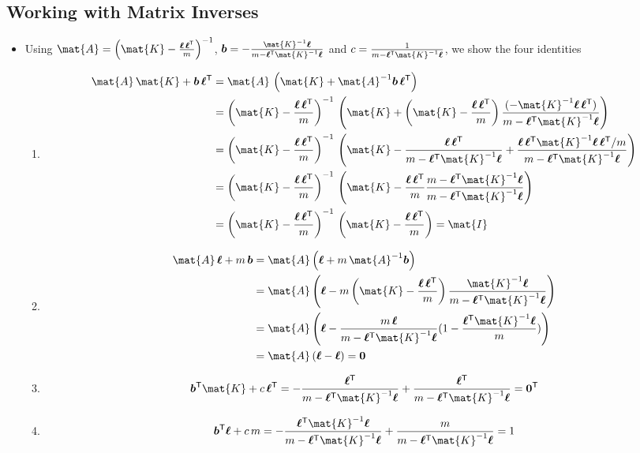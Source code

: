 \documentclass[11pt]{article}
\newcommand{\tr}{\textsf{T}}
\newcommand{\vl}{\bm{\ell}}
\newcommand{\vb}{\bm{b}}
\begin{document}
\subsection{Working with Matrix Inverses}
\label{sec:org75c8006}
\begin{itemize}
\item Using \(\mat{A} = 
         \left(\mat{K}-\frac{\vl\,\vl^\tr}{m}\right)^{-1}\),
\(\vb=-\frac{\mat{K}^{-1} \vl}{m-\vl^\tr \mat{K}^{-1}\vl}\)
and \(c=\frac{1}{m-\vl^\tr \mat{K}^{-1}\vl}\), we show the four identities
\begin{enumerate}
\item \begin{align*}
\mat{A}\,\mat{K} + \vb\,\vl^\tr
&= \mat{A}\,\left(\mat{K} + \mat{A}^{-1} \vb\,\vl^\tr\right) \\
&=\left(\mat{K}-\frac{\vl\,\vl^\tr}{m}\right)^{-1} \,\left(\mat{K} +
\left(\mat{K}-\frac{\vl\,\vl^\tr}{m}\right)
 \frac{(-\mat{K}^{-1} \vl\,\vl^\tr)}{m-\vl^\tr \mat{K}^{-1}\vl} \right) \\
 &= \left(\mat{K}-\frac{\vl\,\vl^\tr}{m}\right)^{-1} \,\left(\mat{K} 
- \frac{\vl\,\vl^\tr}{m-\vl^\tr \mat{K}^{-1}\vl}
+ \frac{\vl\,\vl^\tr\mat{K}^{-1}\vl\,\vl^\tr/m}{m-\vl^\tr \mat{K}^{-1}\vl} \right)\\
&= \left(\mat{K}-\frac{\vl\,\vl^\tr}{m}\right)^{-1} \,\left(\mat{K} 
- \frac{\vl\,\vl^\tr}{m} 
  \frac{m-\vl^\tr \mat{K}^{-1}\vl}{m-\vl^\tr \mat{K}^{-1}\vl}\right) \\
&= \left(\mat{K}-\frac{\vl\,\vl^\tr}{m}\right)^{-1} \,\left(\mat{K} 
- \frac{\vl\,\vl^\tr}{m} \right) = \mat{I}
\end{align*}
\item \begin{align*}
\mat{A}\,\vl + m\,\vb 
&=  \mat{A} \left( \vl + m \,\mat{A}^{-1}\vb\right) \\
&= \mat{A} \left( \vl - m
\left(\mat{K}-\frac{\vl\,\vl^\tr}{m}\right)
 \frac{\mat{K}^{-1} \vl}{m-\vl^\tr \mat{K}^{-1}\vl} \right) \\
&=\mat{A} \left( \vl 
- \frac{m\,\vl}{m-\vl^\tr \mat{K}^{-1}\vl} (1 -\frac{\vl^\tr \mat{K}^{-1}\vl}{m}) \right)\\
&= \mat{A} \left( \vl -\vl \right) = \bm{0}
\end{align*}
\item $$ \vb^\tr\mat{K} + c\,\vl^\tr = -\frac{\vl^\tr}{m-\vl^\tr
          \mat{K}^{-1}\vl} + \frac{\vl^\tr}{m-\vl^\tr
          \mat{K}^{-1}\vl}= \bm{0}^\tr $$
\item $$ \vb^\tr \vl + c\,m =  -\frac{\vl^\tr \mat{K}^{-1} \vl}{m-\vl^\tr \mat{K}^{-1}\vl} + \frac{m}{m-\vl^\tr \mat{K}^{-1}\vl} = 1 $$
\end{enumerate}
\end{itemize}
\end{document}
